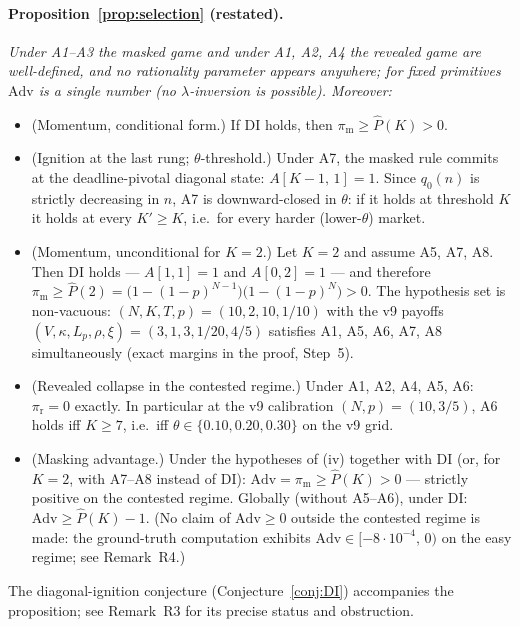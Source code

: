 \paragraph{Proposition~\ref{prop:selection} (restated).}
{\itshape Under A1--A3 the masked game and under A1, A2, A4 the revealed game are well-defined, and no rationality parameter appears anywhere; for fixed primitives $\mathrm{Adv}$ is a single number (no $\lambda$-inversion is possible). Moreover:
\begin{itemize}
\item[(i)] \textup{(Momentum, conditional form.)} If DI holds, then $\pi_{\mathrm{m}} \ge \widehat P(K) > 0$.
\item[(ii)] \textup{(Ignition at the last rung; $\theta$-threshold.)} Under A7, the masked rule commits at the deadline-pivotal diagonal state: $A[K-1,\, 1] = 1$. Since $q_0(n)$ is strictly decreasing in $n$, A7 is downward-closed in $\theta$: if it holds at threshold $K$ it holds at every $K' \ge K$, i.e.\ for every harder (lower-$\theta$) market.
\item[(iii)] \textup{(Momentum, unconditional for $K = 2$.)} Let $K = 2$ and assume A5, A7, A8. Then DI holds --- $A[1,1] = 1$ and $A[0,2] = 1$ --- and therefore $\pi_{\mathrm{m}} \ge \widehat P(2) = \bigl(1 - (1-p)^{N-1}\bigr)\bigl(1 - (1-p)^N\bigr) > 0$. The hypothesis set is non-vacuous: $(N,K,T,p) = (10, 2, 10, 1/10)$ with the v9 payoffs $(V, \kappa, L_p, \rho, \xi) = (3, 1, 3, 1/20, 4/5)$ satisfies A1, A5, A6, A7, A8 simultaneously (exact margins in the proof, Step~5).
\item[(iv)] \textup{(Revealed collapse in the contested regime.)} Under A1, A2, A4, A5, A6: $\pi_{\mathrm{r}} = 0$ exactly. In particular at the v9 calibration $(N,p) = (10, 3/5)$, A6 holds iff $K \ge 7$, i.e.\ iff $\theta \in \{0.10, 0.20, 0.30\}$ on the v9 grid.
\item[(v)] \textup{(Masking advantage.)} Under the hypotheses of (iv) together with DI (or, for $K = 2$, with A7--A8 instead of DI): $\mathrm{Adv} = \pi_{\mathrm{m}} \ge \widehat P(K) > 0$ --- strictly positive on the contested regime. Globally (without A5--A6), under DI: $\mathrm{Adv} \ge \widehat P(K) - 1$. (No claim of $\mathrm{Adv} \ge 0$ outside the contested regime is made: the ground-truth computation exhibits $\mathrm{Adv} \in [-8 \cdot 10^{-4},\, 0)$ on the easy regime; see Remark~R4.)
\end{itemize}}

\noindent The diagonal-ignition conjecture (Conjecture~\ref{conj:DI}) accompanies the proposition; see Remark~R3 for its precise status and obstruction.


